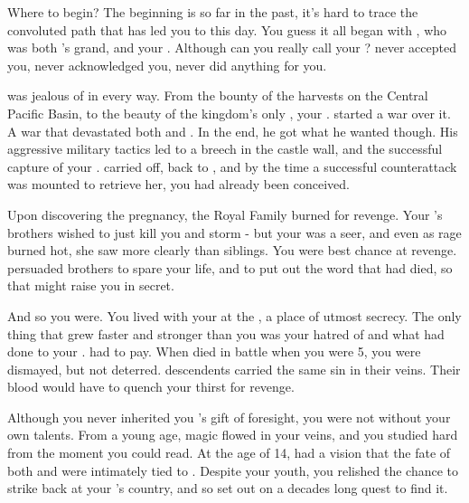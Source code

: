 \documentclass[char]{NeptuneBall}
\begin{document}
\name{\cManta{}}



Where to begin? The beginning is so far in the past, it's hard to trace the convoluted path that has led you to this day. You guess it all began with \cExExKing{\King} \cExExKing{}, who was both \cKing{\King} \cKing{}'s grand\cExExKing{\parent}, and your \cExExKing{\parent}. Although can you really call \cExExKing{\them} your \cExExKing{\parent}? \cExExKing{\They} never accepted you, never acknowledged you, never did anything for you.

\cExExKing{\They} was jealous of \pPacifica{} in every way. From the bounty of the harvests on the Central Pacific Basin, to the beauty of the kingdom's only \cMother{\prince}, your \cMother{\parent} \cMother{\MYname}. \cExExKing{} started a war over it. A war that devastated both \pPacifica{} and \pAtlantis{}. In the end, he got what he wanted though. His aggressive military tactics led to a breech in the castle wall, and the successful capture of your \cMother{\parent}. \cExExKing{} carried \cMother{\them} off, back to \pAtlantis{}, and by the time a successful counterattack was mounted to retrieve her, you had already been conceived.

Upon discovering the pregnancy, the Royal Family burned for revenge. Your \cMother{\parent}'s brothers wished to just kill you and storm \pAtlantis{} - but your \cMother{\parent} was a seer, and even as \cMother{\their} rage burned hot, she saw more clearly than \cMother{\their} siblings. You were \cMother{\their} best chance at revenge. \cMother{\They} persuaded \cMother{\their} brothers to spare your life, and to put out the word that \cMother{\they} had died, so that \cMother{\they} might raise you in secret.

And so you were. You lived with your \cMother{\parent} at the \pAssassin{}, a place of utmost secrecy. The only thing that grew faster and stronger than you was your hatred of \pAtlantis{} and what \cExExKing{} had done to your \cMother{\parent}. \cExExKing{} had to pay. When \cExExKing{\they} died in battle when you were 5, you were dismayed, but not deterred. \cExExKing{\Their} descendents carried the same sin in their veins. Their blood would have to quench your thirst for revenge. 

Although you never inherited you \cMother{\parent}'s gift of foresight, you were not without your own talents. From a young age, magic flowed in your veins, and you studied hard from the moment you could read. At the age of 14, \cMother{} had a vision that the fate of both \pPacifica{} and \pAtlantis{} were intimately tied to \iTrident{\MYname}. Despite your youth, you relished the chance to strike back at your \cExExKing{\parent}'s country, and so set out on a decades long quest to find it.
\end{document}
